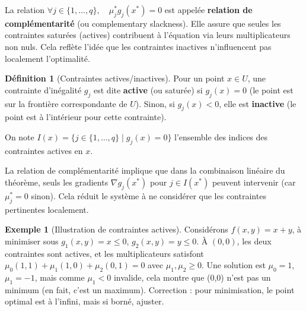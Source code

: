 \documentclass[a4paper,12pt,openany]{book}
\theoremstyle{plain}
\theoremstyle{definition}
\newtheorem{definition}[theorem]{Définition}
\newtheorem{example}[theorem]{Exemple}
\theoremstyle{remark}
\theoremstyle{nbstyle}
\begin{document}
	La relation \( \forall j \in \{1, \dots, q\}, \quad \mu^*_j g_j(x^*) = 0 \) est appelée \textbf{relation de complémentarité} (ou complementary slackness). Elle assure que seules les contraintes saturées (actives) contribuent à l'équation via leurs multiplicateurs non nuls. Cela reflète l'idée que les contraintes inactives n'influencent pas localement l'optimalité.
	
	\begin{definition}[Contraintes actives/inactives]
		Pour un point \( x \in U \), une contrainte d'inégalité \( g_j \) est dite \textbf{active} (ou saturée) si \( g_j(x) = 0 \) (le point est sur la frontière correspondante de \( U \)). Sinon, si \( g_j(x) < 0 \), elle est \textbf{inactive} (le point est à l'intérieur pour cette contrainte).
		
		On note \( I(x) = \{ j \in \{1, \dots, q\} \mid g_j(x) = 0 \} \) l'ensemble des indices des contraintes actives en \( x \).
	\end{definition}
	
	La relation de complémentarité implique que dans la combinaison linéaire du théorème, seuls les gradients \( \nabla g_j(x^*) \) pour \( j \in I(x^*) \) peuvent intervenir (car \( \mu_j^* = 0 \) sinon). Cela réduit le système à ne considérer que les contraintes pertinentes localement.
	
	
	\begin{example}[Illustration de contraintes actives]
		Considérons \( f(x,y) = x + y \), à minimiser sous \( g_1(x,y) = x \leq 0 \), \( g_2(x,y) = y \leq 0 \). À \( (0,0) \), les deux contraintes sont actives, et les multiplicateurs satisfont \( \mu_0 (1,1) + \mu_1 (1,0) + \mu_2 (0,1) = 0 \) avec \( \mu_1, \mu_2 \geq 0 \). Une solution est \( \mu_0 = 1 \), \( \mu_1 = -1 \), mais comme \( \mu_1 < 0 \) invalide, cela montre que (0,0) n'est pas un minimum (en fait, c'est un maximum). Correction : pour minimisation, le point optimal est à l'infini, mais si borné, ajuster.
	\end{example}
	
\end{document}

